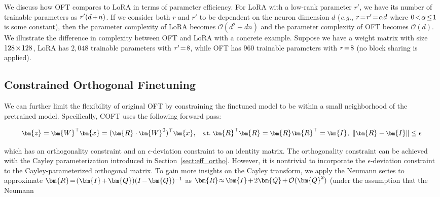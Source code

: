We discuss how OFT compares to LoRA in terms of parameter efficiency. For LoRA with a low-rank parameter $r'$, we have its number of trainable parameters as $\thickmuskip=2mu \medmuskip=2mu r'(d+n)$. If we consider both $r$ and $r'$ to be dependent on the neuron dimension $d$ (\emph{e.g.}, $\thickmuskip=2mu \medmuskip=2mu r=r'=\alpha d$ where $\thickmuskip=2mu \medmuskip=2mu 0<\alpha\leq 1$ is some constant), then the parameter complexity of LoRA becomes $\mathcal{O}(d^2+dn)$ and the parameter complexity of OFT becomes $\mathcal{O}(d)$. We illustrate the difference in complexity between OFT and LoRA with a concrete example. Suppose we have a weight matrix with size $\thickmuskip=2mu \medmuskip=2mu 128\times 128$, LoRA has $2,048$ trainable parameters with $\thickmuskip=2mu \medmuskip=2mu r'=8$, while OFT has $960$ trainable parameters with $\thickmuskip=2mu \medmuskip=2mu r=8$ (no block sharing is applied).

\subsection{Constrained Orthogonal Finetuning}

We can further limit the flexibility of original OFT by constraining the finetuned model to be within a small neighborhood of the pretrained model. Specifically, COFT uses the following forward pass:

\begin{equation}\label{eq:coft_general}
    \footnotesize
    \bm{z}=\bm{W}^\top\bm{x}=(\bm{R}\cdot\bm{W}^0)^\top\bm{x},~~~\text{s.t.}~\bm{R}^\top\bm{R}=\bm{R}\bm{R}^\top=\bm{I},~\left\lVert\bm{R}-\bm{I}\right\rVert\leq \epsilon
\end{equation}

which has an orthogonality constraint and an $\epsilon$-deviation constraint to an identity matrix. The orthogonality constraint can be achieved with the Cayley parameterization introduced in Section~\ref{sect:eff_ortho}. However, it is nontrivial to incorporate the $\epsilon$-deviation constraint to the Cayley-parameterized orthogonal matrix. To gain more insights on the Cayley transform, we apply the Neumann series to approximate $\thickmuskip=2mu \medmuskip=2mu \bm{R}=(\bm{I}+\bm{Q})(I-\bm{Q})^{-1}$ as $\thickmuskip=2mu \medmuskip=2mu \bm{R}\approx\bm{I}+2\bm{Q}+\mathcal{O}(\bm{Q}^2)$ (under the assumption that the Neumann  {\parfillskip=0pt\par}

